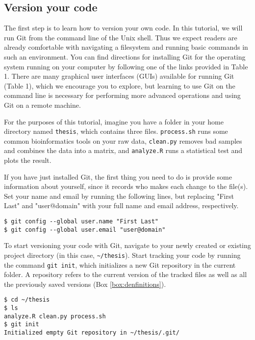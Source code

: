 \subsection{Version your code}

The first step is to learn how to version your own code.
In this tutorial, we will run Git from the command line of the Unix shell.
Thus we expect readers are already comfortable with navigating a filesystem and running basic commands in such an environment.
You can find directions for installing Git for the operating system running on your computer by following one of the links provided in Table 1.
There are many graphical user interfaces (GUIs) available for running Git (Table 1), which we encourage you to explore, but learning to use Git on the command line is necessary for performing more advanced operations and using Git on a remote machine.

For the purposes of this tutorial, imagine you have a folder in your home directory named \verb|thesis|, which contains three files.
\verb|process.sh| runs some common bioinformatics tools on your raw data, \verb|clean.py| removes bad samples and combines the data into a matrix, and \verb|analyze.R| runs a statistical test and plots the result.

If you have just installed Git, the first thing you need to do is provide some information about yourself, since it records who makes each change to the file(s).
Set your name and email by running the following lines, but replacing "First Last" and "user@domain" with your full name and email address, respectively.

\begin{lstlisting}
$ git config --global user.name "First Last"
$ git config --global user.email "user@domain"
\end{lstlisting}

To start versioning your code with Git, navigate to your newly created or existing project directory (in this case, \verb|~/thesis|).
Start tracking your code by running the command \verb|git init|, which initializes a new Git repository in the current folder.
A repository refers to the current version of the tracked files as well as all the previously saved versions (Box \ref{box:denfinitions}).

\begin{lstlisting}
$ cd ~/thesis
$ ls
analyze.R clean.py process.sh
$ git init
Initialized empty Git repository in ~/thesis/.git/
\end{lstlisting}

